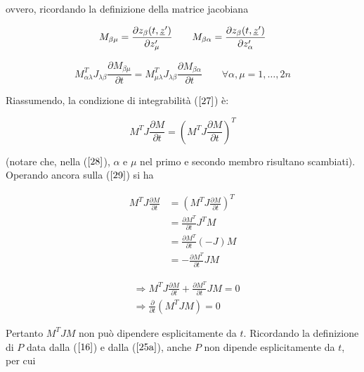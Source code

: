 ovvero, ricordando la definizione della matrice jacobiana

\begin{equation*}
  M_{\beta\mu} = \frac{\partial z_\beta (t, \uline{z}')}{\partial z'_\mu} \qquad M_{\beta\alpha} = \frac{\partial z_\beta (t, \uline{z}')}{\partial z'_\alpha}
\end{equation*}

\begin{equation} \label{28}
  M^T_{\alpha \lambda} J_{\lambda \beta} \frac{\partial M_{\beta \mu}}{\partial t} = M^T_{\mu \lambda} J_{\lambda \beta} \frac{\partial M_{\beta \alpha}}{\partial t} \qquad \forall \alpha, \mu = 1, \dots , 2n
\end{equation}

Riassumendo, la condizione di integrabilità ($ \ref{27} $) è:

\begin{equation} \label{29}
  M^T J \frac{\partial M}{\partial t} = \left( M^T J \frac{\partial M}{\partial t} \right)^T
\end{equation}

(notare che, nella ($ \ref{28} $), $ \alpha $ e $ \mu $ nel primo e secondo membro risultano scambiati).\\
Operando ancora sulla ($ \ref{29} $) si ha

\begin{equation*}
  \begin{split}
    M^T J \frac{\partial M}{\partial t} & = \left( M^T J \frac{\partial M}{\partial t} \right)^T \\
    & = \frac{\partial M^T}{\partial t} J^T M \\
    & = \frac{\partial M^T}{\partial t} (-J) M \\
    & = -\frac{\partial M^T}{\partial t} J M
  \end{split}
\end{equation*}

\begin{equation*}
  \begin{split}
    &\Rightarrow M^T J \frac{\partial M}{\partial t} + \frac{\partial M^T}{\partial t} J M = 0 \\
    &\Rightarrow \frac{\partial }{\partial t}(M^T J M) = 0 
  \end{split}
\end{equation*}

Pertanto $ M^T J M $ non può dipendere esplicitamente da $ t $. Ricordando la definizione di $ P $ data dalla ($ \ref{16} $) e dalla ($ \ref{25a} $), anche $ P $ non dipende esplicitamente da $ t $, per cui

